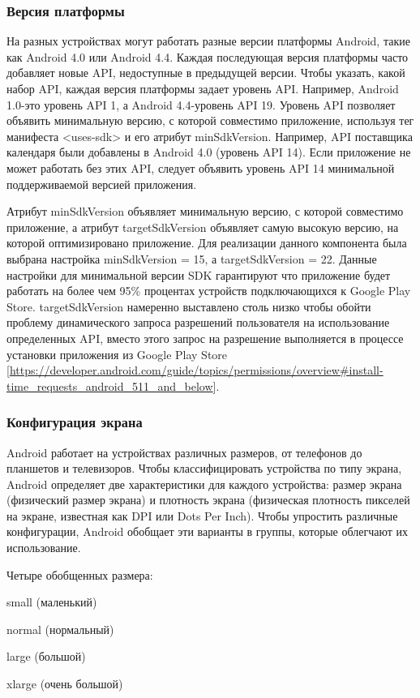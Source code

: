 \subsubsection{Версия платформы}
На разных устройствах могут работать разные версии платформы Android, такие как Android 4.0 или Android 4.4. Каждая последующая версия платформы часто добавляет новые API, недоступные в предыдущей версии. Чтобы указать, какой набор API, каждая версия платформы задает уровень API. Например, Android 1.0-это уровень API 1, а Android 4.4-уровень API 19.
Уровень API позволяет объявить минимальную версию, с которой совместимо приложение, используя тег манифеста <uses-sdk> и его атрибут minSdkVersion. Например, API поставщика календаря были добавлены в Android 4.0 (уровень API 14). Если приложение не может работать без этих API, следует объявить уровень API 14 минимальной поддерживаемой версией приложения.

Атрибут minSdkVersion объявляет минимальную версию, с которой совместимо приложение, а атрибут targetSdkVersion объявляет самую высокую версию, на которой оптимизировано приложение.
Для реализации данного компонента была выбрана настройка minSdkVersion = 15, а targetSdkVersion = 22. Данные настройки для минимальной версии SDK гарантируют что приложение будет работать на более чем 95\% процентах устройств подключающихся к Google Play Store. targetSdkVersion намеренно выставлено столь низко чтобы обойти проблему динамического запроса разрешений пользователя на использование определенных API, вместо этого запрос на разрешение выполняется в процессе установки приложения из Google Play Store [\url{https://developer.android.com/guide/topics/permissions/overview#install-time_requests_android_511_and_below}].

\subsubsection{Конфигурация экрана}
Android работает на устройствах различных размеров, от телефонов до планшетов и телевизоров. Чтобы классифицировать устройства по типу экрана, Android определяет две характеристики для каждого устройства: размер экрана (физический размер экрана) и плотность экрана (физическая плотность пикселей на экране, известная как DPI или Dots Per Inch). Чтобы упростить различные конфигурации, Android обобщает эти варианты в группы, которые облегчают их использование.

Четыре обобщенных размера: 
\begin{my_enumerate}
\item small (маленький)
\item normal (нормальный)
\item large (большой)
\item xlarge (очень большой)
\end{my_enumerate}

